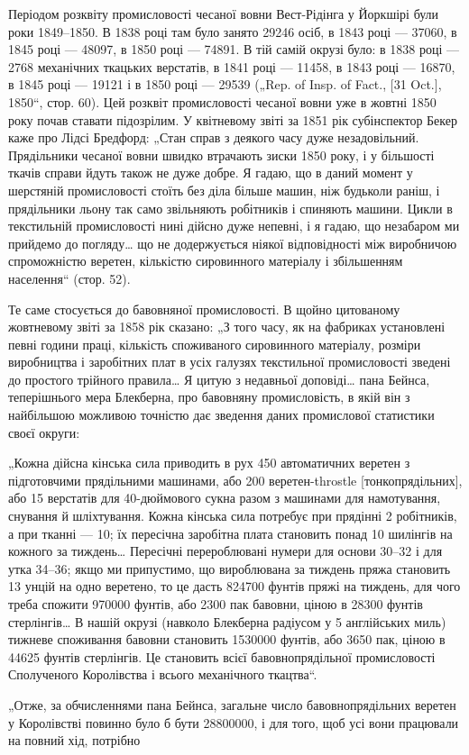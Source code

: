 
Періодом розквіту промисловості чесаної вовни Вест-Рідінга
у Йоркшірі були роки 1849--1850. В 1838 році там було занято
29246 осіб, в 1843 році — 37060, в 1845 році — 48097, в 1850 році —
74891. В тій самій окрузі було: в 1838 році — 2768 механічних
ткацьких верстатів, в 1841 році — 11458, в 1843 році — 16870,
в 1845 році — 19121 і в 1850 році — 29539 („Rep. of Insp. of Fact.,
[31 Oct.], 1850“, стор. 60). Цей розквіт промисловості чесаної
вовни уже в жовтні 1850 року почав ставати підозрілим. У квітневому
звіті за 1851 рік субінспектор Бекер каже про Лідсі Бредфорд:
„Стан справ з деякого часу дуже незадовільний. Прядільники
чесаної вовни швидко втрачають зиски 1850 року, і у більшості
ткачів справи йдуть також не дуже добре. Я гадаю, що
в даний момент у шерстяній промисловості стоїть без діла більше
машин, ніж будьколи раніш, і прядільники льону так само звільняють
робітників і спиняють машини. Цикли в текстильній промисловості
нині дійсно дуже непевні, і я гадаю, що незабаром
ми прийдемо до погляду\dots{} що не додержується ніякої відповідності
між виробничою спроможністю веретен, кількістю сировинного
матеріалу і збільшенням населення“ (стор. 52).

Те саме стосується до бавовняної промисловості. В щойно
цитованому жовтневому звіті за 1858 рік сказано: „З того часу,
як на фабриках установлені певні години праці, кількість споживаного
сировинного матеріалу, розміри виробництва і заробітних
плат в усіх галузях текстильної промисловості зведені
до простого трійного правила\dots{} Я цитую з недавньої доповіді\dots{}
пана Бейнса, теперішнього мера Блекберна, про бавовняну промисловість,
в якій він з найбільшою можливою точністю дає
зведення даних промислової статистики своєї округи:

„Кожна дійсна кінська сила приводить в рух 450 автоматичних
веретен з підготовчими прядільними машинами, або 200 веретен-throstle
[тонкопрядільних], або 15 верстатів для 40-дюймового
сукна разом з машинами для намотування, снування й
шліхтування. Кожна кінська сила потребує при прядінні 2 робітників,
а при тканні — 10; їх пересічна заробітна плата становить
понад 10  шилінгів на кожного за тиждень\dots{} Пересічні
перероблювані нумери для основи 30--32 і для утка 34--36;
якщо ми припустимо, що вироблювана за тиждень пряжа становить
13 унцій на одно веретено, то це дасть 824700 фунтів
пряжі на тиждень, для чого треба спожити 970000 фунтів, або
2300 пак бавовни, ціною в 28300 фунтів стерлінгів\dots{} В нашій
окрузі (навколо Блекберна радіусом у 5 англійських миль)
тижневе споживання бавовни становить 1530000 фунтів, або
3650 пак, ціною в 44625 фунтів стерлінгів. Це становить 
всієї бавовнопрядільної промисловості Сполученого Королівства
і   всього механічного ткацтва“.

„Отже, за обчисленнями пана Бейнса, загальне число бавовнопрядільних
веретен у Королівстві повинно було б бути 28800000,
і для того, щоб усі вони працювали на повний хід, потрібно
\parbreak{}  %

